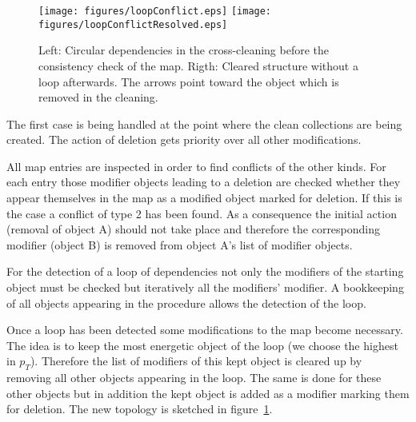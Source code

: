 \documentclass{cmspaper}
\begin{document}
\begin{figure}[hb]
\begin{center}
    \texttt{[image: figures/loopConflict.eps]}
    \hspace*{1.5cm}
    \texttt{[image: figures/loopConflictResolved.eps]}
    \caption{Left: Circular dependencies in the cross-cleaning before the
    consistency check of the map. Rigth: Cleared structure without a loop
    afterwards. The arrows point toward the object which is removed in the
    cleaning.}
    \label{fig:loopReso}
\end{center}
\end{figure}

The first case is being handled at the point where the clean collections are
being created. The action of deletion gets priority over all other
modifications.

All map entries are inspected in order to find conflicts of the other kinds.
For each entry those modifier objects leading to a deletion are checked whether
they appear themselves in the map as a modified object marked for deletion. If
this is the case a conflict of type 2 has been found. As a consequence the
initial action (removal of object A)  should not take place and  therefore the
corresponding modifier (object B) is removed from object A's list of modifier
objects.

For the detection of a loop of dependencies not only the modifiers of the
starting object must be checked but iteratively all the modifiers' modifier. A
bookkeeping of all objects appearing in the procedure allows the detection of
the loop.

Once a loop has been detected some modifications to the map become necessary.
The idea is to keep the most energetic object of the loop (we choose the
highest in $p_T$). Therefore the list of modifiers of this kept object is
cleared up by removing all other objects appearing in the loop.  The same is
done for these other objects but in addition the kept object is added as a
modifier marking them for deletion. The new topology is sketched in
figure~\ref{fig:loopReso}.

\end{document}
